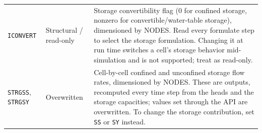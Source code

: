 \begin{longtable}{p{} p{} p{}}
\texttt{ICONVERT} & Structural / read-only &
Storage convertibility flag (0 for confined storage, nonzero for
convertible/water-table storage), dimensioned by NODES. Read every formulate step
to select the storage formulation. Changing it at run time switches a cell's
storage behavior mid-simulation and is not supported; treat as read-only. \\

\texttt{STRGSS}, \texttt{STRGSY} & Overwritten &
Cell-by-cell confined and unconfined storage flow rates, dimensioned by NODES.
These are outputs, recomputed every time step from the heads and the storage
capacities; values set through the API are overwritten. To change the storage
contribution, set \texttt{SS} or \texttt{SY} instead. \\

\hline
\end{longtable}
